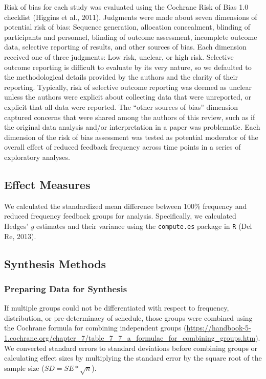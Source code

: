 \documentclass[
  english,
  man, donotrepeattitle,floatsintext]{apa7}
\begin{document}
Risk of bias for each study was evaluated using the Cochrane Risk of Bias 1.0 checklist (Higgins et al., 2011). Judgments were made about seven dimensions of potential risk of bias: Sequence generation, allocation concealment, blinding of participants and personnel, blinding of outcome assessment, incomplete outcome data, selective reporting of results, and other sources of bias. Each dimension received one of three judgments: Low risk, unclear, or high risk. Selective outcome reporting is difficult to evaluate by its very nature, so we defaulted to the methodological details provided by the authors and the clarity of their reporting. Typically, risk of selective outcome reporting was deemed as unclear unless the authors were explicit about collecting data that were unreported, or explicit that all data were reported. The ``other sources of bias'' dimension captured concerns that were shared among the authors of this review, such as if the original data analysis and/or interpretation in a paper was problematic. Each dimension of the risk of bias assessment was tested as potential moderator of the overall effect of reduced feedback frequency across time points in a series of exploratory analyses.

\hypertarget{effect-measures}{%
\subsection{Effect Measures}\label{effect-measures}}

We calculated the standardized mean difference between 100\% frequency and reduced frequency feedback groups for analysis. Specifically, we calculated Hedges' \emph{g} estimates and their variance using the \texttt{compute.es} package in \texttt{R} (Del Re, 2013).

\hypertarget{synthesis-methods}{%
\subsection{Synthesis Methods}\label{synthesis-methods}}

\hypertarget{preparing-data-for-synthesis}{%
\subsubsection{Preparing Data for Synthesis}\label{preparing-data-for-synthesis}}

If multiple groups could not be differentiated with respect to frequency, distribution, or pre-determinacy of schedule, those groups were combined using the Cochrane formula for combining independent groups (\url{https://handbook-5-1.cochrane.org/chapter_7/table_7_7_a_formulae_for_combining_groups.htm}). We converted standard errors to standard deviations before combining groups or calculating effect sizes by multiplying the standard error by the square root of the sample size (\(SD = SE*\sqrt{n}\)).
\end{document}
